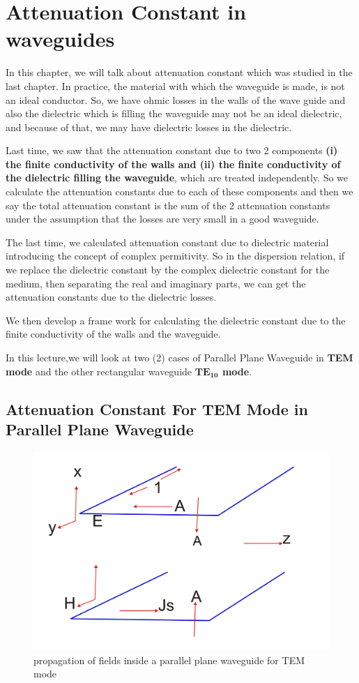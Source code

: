 \chapter{Attenuation Constant in waveguides}
In this chapter, we will talk about attenuation constant which was studied in the last chapter. In practice, the material with which the waveguide is made, is not an ideal conductor. So, we have ohmic losses in the walls  of the wave guide and also the dielectric which is filling the waveguide may not be an ideal dielectric, and because of that, we may have dielectric losses in the dielectric.

Last time, we saw that the attenuation constant due to two {2} components \textbf{(i) the finite conductivity of the walls and (ii) the finite conductivity of the dielectric filling the waveguide}, which are treated independently. So we calculate the attenuation constants due to each of these components and then we say the total attenuation constant is the sum of the 2 attenuation constants under the assumption that the losses are very small in a good waveguide.

The last time, we calculated attenuation constant due to dielectric material introducing the concept of complex permitivity. So in the dispersion relation, if we replace the dielectric constant by the complex dielectric constant for the medium, then separating the real and imaginary parts, we can get the attenuation constants due to the dielectric losses.

We then develop a frame work for calculating the dielectric constant due to the finite conductivity of the walls and the waveguide.

In this lecture,we will look at two (2) cases of Parallel Plane Waveguide in \textbf{TEM mode} and the other rectangular waveguide \textbf{$\boldsymbol{TE_{10}}$ mode}.

\section{Attenuation Constant For TEM Mode in Parallel Plane Waveguide}

\begin{figure}[h]
\centering
\includegraphics[scale=0.45]{./graphics/lecture2-image-b.png}
\caption{propagation of fields inside a parallel plane waveguide for TEM mode}
\end{figure}

